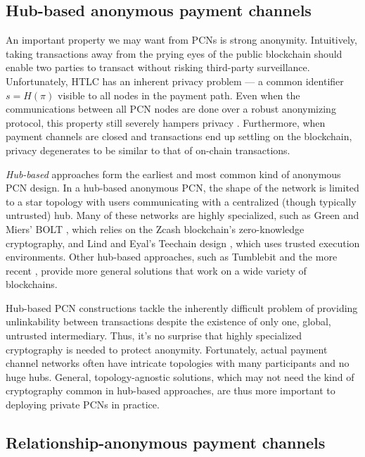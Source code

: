 \documentclass[USenglish,oneside,twocolumn]{article}
\begin{document}
\subsection{Hub-based anonymous payment channels}

An important property we may want from PCNs is strong anonymity. Intuitively, taking transactions away from the prying eyes of the public blockchain should enable two parties to transact without risking third-party surveillance. Unfortunately, HTLC has an inherent privacy problem --- a common identifier $s=H(\pi)$ visible to all nodes in the payment path. Even when the communications between all PCN nodes are done over a robust anonymizing protocol, this property still severely hampers privacy \cite{green2017bolt,malavolta2017concurrency,malavolta2019anonymous}. Furthermore, when payment channels are closed and transactions end up settling on the blockchain, privacy degenerates to be similar to that of on-chain transactions.

\emph{Hub-based} approaches form the earliest and most common kind of anonymous PCN design. In a hub-based anonymous PCN, the shape of the network is limited to a star topology with users communicating with a centralized (though typically untrusted) hub. Many of these networks are highly specialized, such as Green and Miers' BOLT \cite{green2017bolt}, which relies on the Zcash blockchain's zero-knowledge cryptography, and Lind and Eyal's Teechain design \cite{lind2016teechan}, which uses trusted execution environments. Other hub-based approaches, such as Tumblebit \cite{heilman2017tumblebit} and the more recent \cite{tairi2019a2l}, provide more general solutions that work on a wide variety of blockchains.

Hub-based PCN constructions tackle the inherently difficult problem of providing unlinkability between transactions despite the existence of only one, global, untrusted intermediary. Thus, it's no surprise that highly specialized cryptography is needed to protect anonymity. Fortunately, actual payment channel networks often have intricate topologies with many participants and no huge hubs. General, topology-agnostic solutions, which may not need the kind of cryptography common in hub-based approaches, are thus more important to deploying private PCNs in practice.

\subsection{Relationship-anonymous payment channels}
\end{document}
